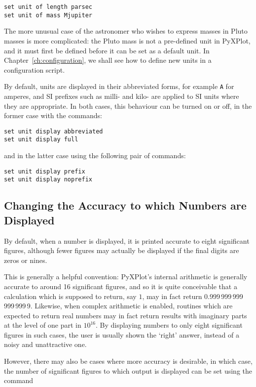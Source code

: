 \begin{verbatim}
set unit of length parsec
set unit of mass Mjupiter
\end{verbatim}

The more unusual case of the astronomer who wishes to express masses in Pluto
masses is more complicated: the Pluto mass is not a pre-defined unit in
PyXPlot, and it must first be defined before it can be set as a default unit.
In Chapter~\ref{ch:configuration}, we shall see how to define new units in a
configuration script.

By default, units are displayed in their abbreviated forms, for example {\tt A} for amperes, and SI prefixes such as milli- and kilo- are applied to SI units where they are appropriate. In both cases, this behaviour
can be turned on or off, in the former case with the commands:

\begin{verbatim}
set unit display abbreviated
set unit display full
\end{verbatim}

\noindent and in the latter case using the following pair of commands:

\begin{verbatim}
set unit display prefix
set unit display noprefix
\end{verbatim}

\subsection{Changing the Accuracy to which Numbers are Displayed}

By default, when a number is displayed, it is printed accurate to eight
significant figures, although fewer figures may actually be displayed if the
final digits are zeros or nines.

This is generally a helpful convention: PyXPlot's internal arithmetic is
generally accurate to around 16 significant figures, and so it is quite
conceivable that a calculation which is supposed to return, say $1$, may in
fact return 0.999\,999\,999\,999\,999\,9. Likewise, when complex arithmetic is
enabled, routines which are expected to return real numbers may in fact return
results with imaginary parts at the level of one part in $10^{16}$.  By
displaying numbers to only eight significant figures in such cases, the user is
usually shown the `right' answer, instead of a noisy and unattractive one.

However, there may also be cases where more accuracy is desirable, in which
case, the number of significant figures to which output is displayed can be set
using the command

